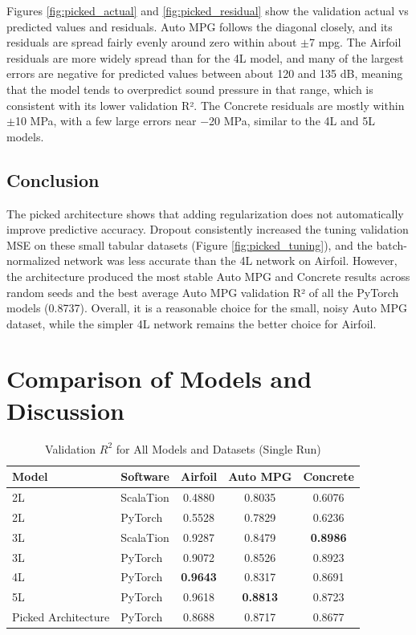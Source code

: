 \documentclass{article}
\begin{document}
Figures \ref{fig:picked_actual} and \ref{fig:picked_residual} show the validation actual vs predicted values and residuals. Auto MPG follows the diagonal closely, and its residuals are spread fairly evenly around zero within about $\pm$7 mpg. The Airfoil residuals are more widely spread than for the 4L model, and many of the largest errors are negative for predicted values between about 120 and 135 dB, meaning that the model tends to overpredict sound pressure in that range, which is consistent with its lower validation R². The Concrete residuals are mostly within $\pm$10 MPa, with a few large errors near $-$20 MPa, similar to the 4L and 5L models.

\subsection{Conclusion}
The picked architecture shows that adding regularization does not automatically improve predictive accuracy. Dropout consistently increased the tuning validation MSE on these small tabular datasets (Figure \ref{fig:picked_tuning}), and the batch-normalized network was less accurate than the 4L network on Airfoil. However, the architecture produced the most stable Auto MPG and Concrete results across random seeds and the best average Auto MPG validation R² of all the PyTorch models (0.8737). Overall, it is a reasonable choice for the small, noisy Auto MPG dataset, while the simpler 4L network remains the better choice for Airfoil.

\section{Comparison of Models and Discussion}
\begin{table}[H]
    \centering
    \caption{Validation $R^2$ for All Models and Datasets (Single Run)}
    \label{tab:all_models}
    \begin{tabular}{llccc}
        \hline
        \textbf{Model} & \textbf{Software} & \textbf{Airfoil} & \textbf{Auto MPG} & \textbf{Concrete} \\
        \hline
        2L                  & ScalaTion & 0.4880 & 0.8035 & 0.6076 \\
        2L                  & PyTorch   & 0.5528 & 0.7829 & 0.6236 \\
        3L                  & ScalaTion & 0.9287 & 0.8479 & \textbf{0.8986} \\
        3L                  & PyTorch   & 0.9072 & 0.8526 & 0.8923 \\
        4L                  & PyTorch   & \textbf{0.9643} & 0.8317 & 0.8691 \\
        5L                  & PyTorch   & 0.9618 & \textbf{0.8813} & 0.8723 \\
        Picked Architecture & PyTorch   & 0.8688 & 0.8717 & 0.8677 \\
        \hline
    \end{tabular}
\end{table}
\end{document}
